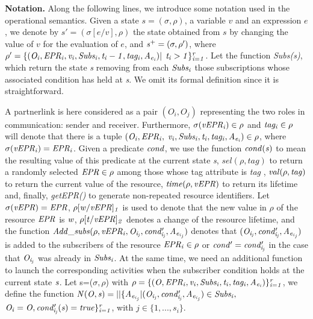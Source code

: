 {\bf Notation.} Along the following lines, we introduce some notation used in the operational semantics. Given a state $s=(\sigma,\rho)$, a variable $v$ and an expression $e$, we denote by $s'=(\sigma[e/v],\rho)$ the state obtained from $s$
by changing the value of $v$ for the evaluation of $e$, and ${\it s{^+}=(\sigma,\rho')}$, where ${\it \rho'=\{(O_i,EPR_i,v_i,Subs_i,t_i-1,tag_i,A_{e{_i}})|}$ ${\it t_i>1\}_{i=1}^r}$. Let the function {\it Subs(s)}, which return the state {\it s} removing from each ${\it Subs_i}$ those subscriptions whose associated condition has held at {\it s}. %
We omit its formal definition since it is straightforward.

A partnerlink is here considered as a pair $(O_i,O_j)$ representing the two roles in communication: sender and receiver. Furthermore, $\it{\sigma(vEPR_i) \in \rho}$ and $\it{tag_i \in \rho}$ will denote that there is a tuple $\it{(O_i,EPR_i,}$ ${\it v_i,Subs_i,t_i,tag_i,A_{e{_i}}) \in \rho}$, where $\it{\sigma(vEPR_i)=EPR_i}$. Given a predicate $\it{cond}$, we use the function $\it{cond(s)}$ to mean the resulting value of this predicate at the current state {\it s}, {\it $sel(\rho,tag)$} to return a randomly selected ${\it EPR \in \rho}$ among those whose tag attribute is {\em tag} , ${\it val(\rho,tag)}$ to return the current value of the resource, ${\it time(\rho,vEPR)}$ to return its lifetime and, finally, {\it getEPR()} to generate non-repeated resource identifiers. Let ${\it \sigma(vEPR)=EPR}$, ${\it \rho[w/vEPR]_1}$ is used to denote that the new value in $\rho$ of the resource $\it{EPR}$ is $\it{w}$, $\it{\rho[t/vEPR]_2}$ denotes a change of the resource lifetime, and the function $\it{Add\_subs(\rho,vEPR_i,O_{i_{j}},cond'_{i_{j}},A_{e{_i{_{_j}}}})}$ denotes that $\it{(O_{i_{j}},cond'_{i_{j}},A_{e{_i{_{_j}}}})}$ is added to the subscribers of the resource $\it{EPR_i \in \rho}$ or ${\it cond'=cond'_{i_{j}}}$ in the case that $\it{O_{i_{j}}}$ was already in ${\it Subs_i}$.
At the same time, we need an additional function to launch the corresponding activities %
when the subscriber condition holds at the current state ${\it s}$. Let s=($\sigma, \rho$) with $\it{ \rho=\{(O,EPR_i,v_i,Subs_i,t_i,tag_i,A_{e{_i}})\}_{i=1}^r}$, we define the function ${\it N(O,s)=||\{A_{e{_i{_{_j}}}}|(O_{i{_j}},cond'_{i_{j}},A_{e{_i{_{_j}}}}) \in Subs_i,}$
${\it O_{i}=O, cond'_{i_{j}}(s)=true\}_{i=1}^r}$, with $j \in \{1,...,s_i\}$.

